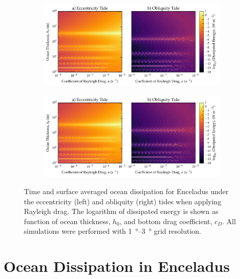 \begin{figure}[!b]
    \centering
    \begin{subfigure}[t]{0.95\linewidth} %
        \includegraphics[width=\linewidth]{Figures/enceladus_linear}
        \label{fig:lincEccEncel}
    \end{subfigure}
    \begin{subfigure}[t]{0\linewidth} %
         \includegraphics[width=\linewidth]{Figures/enceladus_linear}
         \label{fig:linObliqEncel} 
    \end{subfigure}
    \vspace{-0.5cm}
\caption{Time and surface averaged ocean dissipation for Enceladus under the eccentricity (left) and obliquity (right) tides when applying Rayleigh drag. The logarithm of dissipated energy is shown as function of ocean thickness, $h_0$, and bottom drag coefficient, $c_D$. All simulations were performed with \SIrange{1}{3}{\degree} grid resolution. \label{fig:linEncel}}
\end{figure}

\section{Ocean Dissipation in Enceladus \label{sec:results_Enceladus}}

